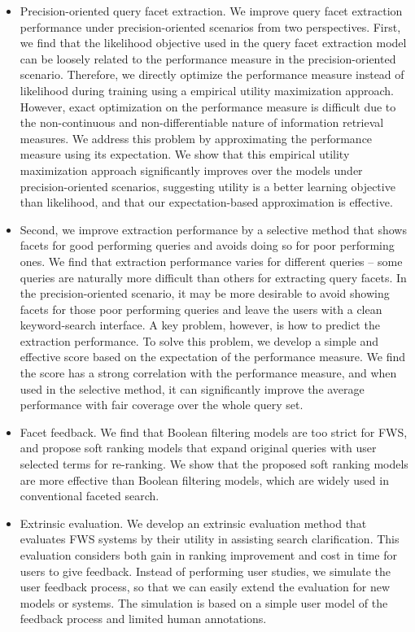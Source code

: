 \begin{itemize}
\item Precision-oriented query facet extraction. We improve query facet extraction performance under precision-oriented scenarios from two perspectives. First, we find that the likelihood objective used in the query facet extraction model can be loosely related to the performance measure in the precision-oriented scenario. Therefore, we directly optimize the performance measure instead of likelihood during training using a empirical utility maximization approach. However, exact optimization on the performance measure is difficult due to the non-continuous and non-differentiable nature of information retrieval measures. We address this problem by approximating the performance measure using its expectation. We show that this empirical utility maximization approach significantly improves over the models under precision-oriented scenarios, suggesting utility is a better learning objective than likelihood, and that our expectation-based approximation is effective.  


\item Second, we improve extraction performance by a selective method that shows facets for good performing queries and avoids doing so for poor performing ones. We find that extraction performance varies for different queries -- some queries are naturally more difficult than others for extracting query facets. In the precision-oriented scenario, it may be more desirable to avoid showing facets for those poor performing queries and leave the users with a clean keyword-search interface. A key problem, however, is how to predict the extraction performance. To solve this problem, we develop a simple and effective score based on the expectation of the performance measure. We find the score has a strong correlation with the performance measure, and when used in the selective method, it can significantly improve the average performance with fair coverage over the whole query set.

 
\item Facet feedback. We find that Boolean filtering models are too strict for FWS, and propose soft ranking models that expand original queries with user selected terms for re-ranking. We show that the proposed soft ranking models are more effective than Boolean filtering models, which are widely used in conventional faceted search.
 
\item Extrinsic evaluation. We develop an extrinsic evaluation method that evaluates FWS systems by their utility in assisting search clarification. This evaluation considers both gain in ranking improvement and cost in time for users to give feedback. Instead of performing user studies, we simulate the user feedback process, so that we can easily extend the evaluation for new models or systems. The simulation is based on a simple user model of the feedback process and limited human annotations.


\end{itemize}
